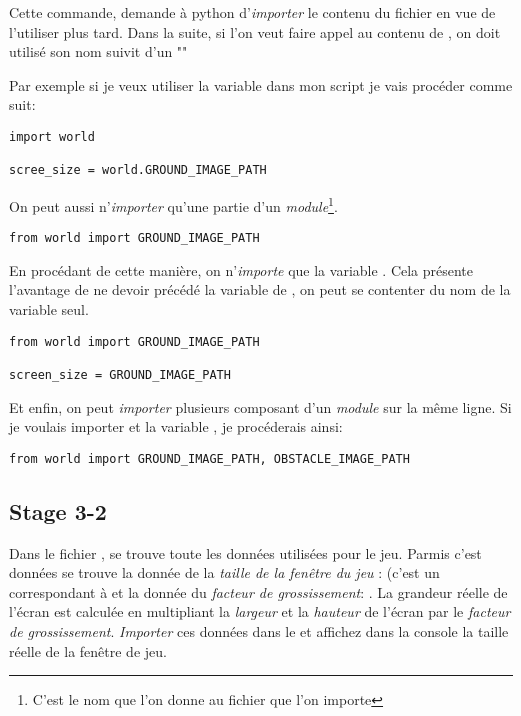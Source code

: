 Cette commande, demande à python d'\emph{importer} le contenu du fichier  en vue de l'utiliser plus tard.
Dans la suite, si l'on veut faire appel au contenu de , on doit utilisé son nom suivit d'un ""

Par exemple si je veux utiliser la variable  dans mon script je vais procéder comme suit:

\begin{lstlisting}
import world

scree_size = world.GROUND_IMAGE_PATH
\end{lstlisting}

On peut aussi n'\emph{importer} qu'une partie d'un \emph{module}\footnote{C'est le nom que l'on donne au fichier que l'on importe}.

\begin{lstlisting}
from world import GROUND_IMAGE_PATH
\end{lstlisting}

En procédant de cette manière, on n'\emph{importe} que la variable .
Cela présente l'avantage de ne devoir précédé la variable  de , on peut se contenter du nom de la variable seul.

\begin{lstlisting}
from world import GROUND_IMAGE_PATH

screen_size = GROUND_IMAGE_PATH
\end{lstlisting}

Et enfin, on peut \emph{importer} plusieurs composant d'un \emph{module} sur la même ligne.
Si je voulais importer  et la variable , je procéderais ainsi:

\begin{lstlisting}
from world import GROUND_IMAGE_PATH, OBSTACLE_IMAGE_PATH
\end{lstlisting}

\subsection{Stage 3-2}
Dans le fichier , se trouve toute les données utilisées pour le jeu. Parmis c'est données se trouve la donnée de la \textit{taille de la fenêtre du jeu} :  (c'est un  correspondant à  et la donnée du \textit{facteur de grossissement}: .
La grandeur réelle de l'écran est calculée en multipliant la \textit{largeur} et la \textit{hauteur} de l'écran par le \textit{facteur de grossissement}.
\emph{Importer} ces données dans le  et affichez dans la console la taille réelle de la fenêtre de jeu.

